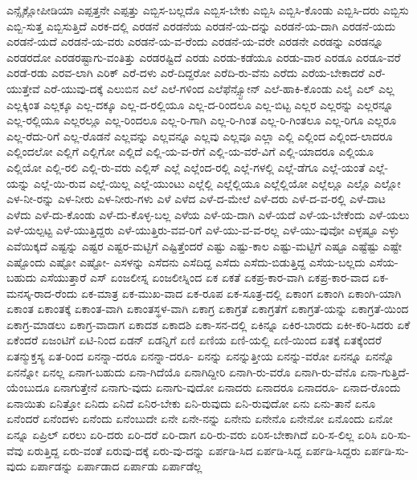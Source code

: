 {ಎನ್ಸೈಕ್ಲೋಪೀಡಿಯಾ
ಎಪ್ಪತ್ತನೇ
ಎಪ್ಪತ್ತು
ಎಬ್ಬಿಸ-ಬಲ್ಲದೊ
ಎಬ್ಬಿಸ-ಬೇಕು
ಎಬ್ಬಿಸಿ
ಎಬ್ಬಿಸಿ-ಕೊಂಡು
ಎಬ್ಬಿಸಿ-ದರು
ಎಬ್ಬಿಸು
ಎಬ್ಬಿ-ಸುತ್ತ
ಎಬ್ಬಿಸುತ್ತಿದೆ
ಎರಕ-ದಲ್ಲಿ
ಎರಡನೆ
ಎರಡನೆಯ
ಎರಡನೆ-ಯ-ದನ್ನು
ಎರಡನೆ-ಯ-ದಾಗಿ
ಎರಡನೆ-ಯದು
ಎರಡನೆ-ಯದೆ
ಎರಡನೆ-ಯ-ವರು
ಎರಡನೆ-ಯ-ವ-ರೆಂದು
ಎರಡನೆ-ಯ-ವರೇ
ಎರಡನೇ
ಎರಡನ್ನು
ಎರಡನ್ನೂ
ಎರಡರದೋ
ಎರಡರಷ್ಟಾಗು-ವಂತಿತ್ತು
ಎರಡರಷ್ಟಿದೆ
ಎರಡು
ಎರಡು-ಕಡೆಯೂ
ಎರಡು-ವಾರ
ಎರಡೂ
ಎರಡೂ-ವರೆ
ಎರಡೆ-ರಡು
ಎರವ-ಲಾಗಿ
ಎರಿಕ್
ಎರೆ-ದಳು
ಎರೆ-ದಿದ್ದರೋ
ಎರೆದಿ-ರು-ವೆನು
ಎರೆದು
ಎರೆಯ-ಬೇಕಾದರೆ
ಎರೆ-ಯುತ್ತೇವೆ
ಎರೆ-ಯುವು-ದಕ್ಕೆ
ಎಲುಬಿನ
ಎಲೆ
ಎಲೆ-ಗಳಿಂದ
ಎಲೆಫೆನ್ಸ್ಟೋನ್
ಎಲೆ-ಹಾಕಿ-ಕೊಂಡು
ಎಲೈ
ಎಲ್
ಎಲ್ಲ
ಎಲ್ಲಕ್ಕಿಂತ
ಎಲ್ಲಕ್ಕೂ
ಎಲ್ಲ-ದಕ್ಕೂ
ಎಲ್ಲ-ದ-ರಲ್ಲಿಯೂ
ಎಲ್ಲ-ದ-ರಿಂದಲೂ
ಎಲ್ಲ-ಬಿಟ್ಟ
ಎಲ್ಲರ
ಎಲ್ಲರನ್ನು
ಎಲ್ಲರನ್ನೂ
ಎಲ್ಲ-ರಲ್ಲಿಯೂ
ಎಲ್ಲರಲ್ಲೂ
ಎಲ್ಲ-ರಿಂದಲೂ
ಎಲ್ಲ-ರಿ-ಗಾಗಿ
ಎಲ್ಲ-ರಿ-ಗಿಂತ
ಎಲ್ಲ-ರಿ-ಗಿಂತಲೂ
ಎಲ್ಲ-ರಿಗೂ
ಎಲ್ಲರೂ
ಎಲ್ಲ-ರೆದು-ರಿಗೆ
ಎಲ್ಲ-ರೊಡನೆ
ಎಲ್ಲವನ್ನು
ಎಲ್ಲವನ್ನೂ
ಎಲ್ಲವು
ಎಲ್ಲವೂ
ಎಲ್ಲಾ
ಎಲ್ಲಿ
ಎಲ್ಲಿಂದ
ಎಲ್ಲಿಂದ-ಲಾದರೂ
ಎಲ್ಲಿಂದಲೋ
ಎಲ್ಲಿಗೆ
ಎಲ್ಲಿಗೋ
ಎಲ್ಲಿದೆ
ಎಲ್ಲಿ-ಯ-ವ-ರೆಗೆ
ಎಲ್ಲಿ-ಯ-ವರೆ-ವಿಗೆ
ಎಲ್ಲಿ-ಯಾದರೂ
ಎಲ್ಲಿಯೂ
ಎಲ್ಲಿಯೋ
ಎಲ್ಲಿ-ರಲಿ
ಎಲ್ಲಿ-ರು-ವರು
ಎಲ್ಲಿಸ್
ಎಲ್ಲೆ
ಎಲ್ಲೆಂದ-ರಲ್ಲಿ
ಎಲ್ಲೆ-ಗಳಲ್ಲಿ
ಎಲ್ಲೆ-ಡೆಗೂ
ಎಲ್ಲೆ-ಯಂತೆ
ಎಲ್ಲೆ-ಯನ್ನು
ಎಲ್ಲೆ-ಯಿ-ರುವ
ಎಲ್ಲೆ-ಯಿಲ್ಲ
ಎಲ್ಲೆ-ಯುಂಟು
ಎಲ್ಲೆಲ್ಲಿ
ಎಲ್ಲೆಲ್ಲಿಯೂ
ಎಲ್ಲೆಲ್ಲಿಯೋ
ಎಲ್ಲೆಲ್ಲೂ
ಎಲ್ಲೊ
ಎಲ್ಲೋ
ಎಳ-ನೀ-ರನ್ನು
ಎಳ-ನೀರು
ಎಳ-ನೀರು-ಗಳು
ಎಳೆ
ಎಳೆದ
ಎಳೆ-ದ-ಮೇಲೆ
ಎಳೆ-ದರು
ಎಳೆ-ದ-ವ-ರಲ್ಲಿ
ಎಳೆ-ದಾಟ
ಎಳೆದು
ಎಳೆ-ದು-ಕೊಂಡು
ಎಳೆ-ದು-ಕೊಳ್ಳ-ಬಲ್ಲ
ಎಳೆಯ
ಎಳೆ-ಯ-ದಾಗಿ
ಎಳೆ-ಯದೆ
ಎಳೆ-ಯ-ಬೇಕೆಂದು
ಎಳೆ-ಯಲು
ಎಳೆ-ಯಲ್ಪಟ್ಟ
ಎಳೆ-ಯುತ್ತಿದ್ದರು
ಎಳೆ-ಯುತ್ತಿರು-ವವ-ರಿಗೆ
ಎಳೆ-ಯು-ವ-ವ-ರಲ್ಲ
ಎಳೆ-ಯು-ವುವೋ
ಎಳ್ಳಷ್ಟೂ
ಎಳ್ಳು
ಎವೆಯಿಕ್ಕದೆ
ಎಷ್ಟನ್ನು
ಎಷ್ಟರ
ಎಷ್ಟರ-ಮಟ್ಟಿಗೆ
ಎಷ್ಟಿತ್ತೆಂದರೆ
ಎಷ್ಟು
ಎಷ್ಟು-ಕಾಲ
ಎಷ್ಟು-ಮಟ್ಟಿಗೆ
ಎಷ್ಟೂ
ಎಷ್ಟೆಷ್ಟು
ಎಷ್ಟೇ
ಎಷ್ಟೊಂದು
ಎಷ್ಟೋ
ಎಷ್ಟೋ-
ಎಸಳನ್ನು
ಎಸೆದನು
ಎಸೆದಿದ್ದ
ಎಸೆದು
ಎಸೆದು-ಬಿಡುತ್ತಿದ್ದ
ಎಸೆಯ-ಬಲ್ಲದು
ಎಸೆಯ-ಬಹುದು
ಎಸೆಯುತ್ತಾರೆ
ಎಸ್
ಏಂಜಲೀಸ್ನ
ಏಂಜಲೀಸ್ನಿಂದ
ಏಕ
ಏಕತೆ
ಏಕಪ್ರ-ಕಾರ-ವಾಗಿ
ಏಕಪ್ರ-ಕಾರ-ವಾದ
ಏಕ-ಮನಸ್ಕ-ರಾದ-ರೆಂದು
ಏಕ-ಮಾತ್ರ
ಏಕ-ಮುಖ-ವಾದ
ಏಕ-ರೂಪ
ಏಕ-ಸೂತ್ರ-ದಲ್ಲಿ
ಏಕಾಂಗ
ಏಕಾಂಗಿ
ಏಕಾಂಗಿ-ಯಾಗಿ
ಏಕಾಂತ
ಏಕಾಂತಕ್ಕೆ
ಏಕಾಂತ-ವಾಗಿ
ಏಕಾಂತಸ್ಥಳ-ವಾಗಿ
ಏಕಾಗ್ರ
ಏಕಾಗ್ರತೆ
ಏಕಾಗ್ರತೆಗೆ
ಏಕಾಗ್ರತೆ-ಯನ್ನು
ಏಕಾಗ್ರತೆ-ಯಿಂದ
ಏಕಾಗ್ರ-ಮಾಡಲು
ಏಕಾಗ್ರ-ವಾದಾಗ
ಏಕಾದಶ
ಏಕಾದಶಿ
ಏಕಾ-ಸನ-ದಲ್ಲಿ
ಏಕಿನ್ನೂ
ಏಕಿರ-ಬಾರದು
ಏಕೀ-ಕರಿ-ಸಿದರು
ಏಕೆ
ಏಕೆಂದರೆ
ಏಜಂಟಿಗೆ
ಏಟಿ-ನಿಂದ
ಏಡನ್
ಏಡನ್ನಿಗೆ
ಏಣಿ
ಏಣಿಯ
ಏಣಿ-ಯಲ್ಲಿ
ಏಣಿ-ಯಿಂದ
ಏತಕ್ಕೆ
ಏತಕ್ಕೆಂದರೆ
ಏತನ್ಮುಕ್ತಸ್ಯ
ಏತ-ರಿಂದ
ಏನನ್ನಾ-ದರೂ
ಏನನ್ನಾ-ದರೂ-
ಏನನ್ನು
ಏನನ್ನುತ್ತೀಯ
ಏನನ್ನು-ವರೋ
ಏನನ್ನೂ
ಏನನ್ನೊ
ಏನನ್ನೋ
ಏನಲ್ಲ
ಏನಾಗ-ಬಹುದು
ಏನಾ-ಗಿದೆಯೊ
ಏನಾಗಿದ್ದೀರಿ
ಏನಾಗಿ-ರು-ವರೊ
ಏನಾಗಿ-ರು-ವೆನೊ
ಏನಾ-ಗುತ್ತಿದೆ-ಯೆಂಬುದೂ
ಏನಾಗುತ್ತೇನೆ
ಏನಾಗು-ವುದು
ಏನಾಗು-ವುದೋ
ಏನಾದರು
ಏನಾದರೂ
ಏನಾದರೂ-
ಏನಾದ-ರೊಂದು
ಏನಾಯಿತು
ಏನಿತ್ತೋ
ಏನಿದು
ಏನಿದೆ
ಏನಿರ-ಬೇಕು
ಏನಿ-ರುವುದು
ಏನಿ-ರುವುದೋ
ಏನು
ಏನು-ತಾನೆ
ಏನೂ
ಏನೆಂದರೆ
ಏನೆಂದಳು
ಏನೆಂದು
ಏನೆಂಬುದೇ
ಏನೇ
ಏನೇ-ನನ್ನು
ಏನೇನು
ಏನೇನೊ
ಏನೇನೋ
ಏನೊಂದು
ಏನೋ
ಏನ್ನೂ
ಏಪ್ರಿಲ್
ಏರಲು
ಏರಿ-ದರು
ಏರಿ-ದರೆ
ಏರಿ-ದಾಗ
ಏರಿ-ರು-ವರು
ಏರಿಸ-ಬೇಕಾಗಿದೆ
ಏರಿ-ಸ-ಲಿಲ್ಲ
ಏರಿಸಿ
ಏರಿ-ಸು-ವೆವು
ಏರುತ್ತಿದ್ದ
ಏರು-ವಂತೆ
ಏರುವು-ದಕ್ಕೆ
ಏರು-ವು-ದನ್ನು
ಏರ್ಪಡಿ-ಸಿದ
ಏರ್ಪಡಿ-ಸಿದ್ದ
ಏರ್ಪಡಿ-ಸಿದ್ದರು
ಏರ್ಪಡಿ-ಸು-ವುದು
ಏರ್ಪಾಡನ್ನು
ಏರ್ಪಾಡಾದ
ಏರ್ಪಾಡು
ಏರ್ಪಾಡೆಲ್ಲ
}
